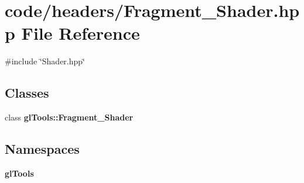 \section{code/headers/\+Fragment\+\_\+\+Shader.hpp File Reference}
\label{_fragment___shader_8hpp}
{\ttfamily \#include \char`\"{}Shader.\+hpp\char`\"{}}\newline
\subsection*{Classes}
\begin{DoxyCompactItemize}
\item 
class \textbf{ gl\+Tools\+::\+Fragment\+\_\+\+Shader}
\end{DoxyCompactItemize}
\subsection*{Namespaces}
\begin{DoxyCompactItemize}
\item 
 \textbf{ gl\+Tools}
\end{DoxyCompactItemize}
